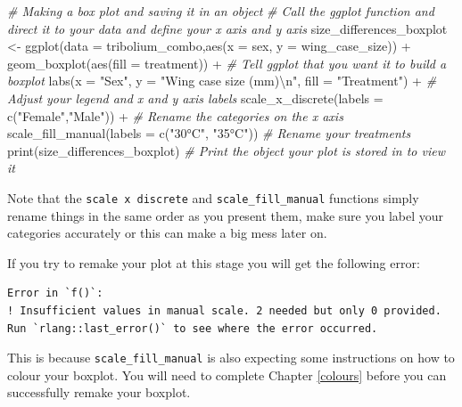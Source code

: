 \documentclass[
]{book}
\newenvironment{Shaded}{\begin{snugshade}}{\end{snugshade}}
\newcommand{\AttributeTok}[1]{\textcolor[rgb]{0.77,0.63,0.00}{#1}}
\newcommand{\CommentTok}[1]{\textcolor[rgb]{0.56,0.35,0.01}{\textit{#1}}}
\newcommand{\FunctionTok}[1]{\textcolor[rgb]{0.00,0.00,0.00}{#1}}
\newcommand{\NormalTok}[1]{#1}
\newcommand{\OtherTok}[1]{\textcolor[rgb]{0.56,0.35,0.01}{#1}}
\newcommand{\SpecialCharTok}[1]{\textcolor[rgb]{0.00,0.00,0.00}{#1}}
\newcommand{\StringTok}[1]{\textcolor[rgb]{0.31,0.60,0.02}{#1}}
\begin{document}
\begin{Shaded}
\begin{Highlighting}[]
\CommentTok{\# Making a box plot and saving it in an object}
\CommentTok{\# Call the ggplot function and direct it to your data and define your x axis and y axis}
\NormalTok{size\_differences\_boxplot }\OtherTok{\textless{}{-}} \FunctionTok{ggplot}\NormalTok{(}\AttributeTok{data =}\NormalTok{ tribolium\_combo,}\FunctionTok{aes}\NormalTok{(}\AttributeTok{x =}\NormalTok{ sex, }\AttributeTok{y =}\NormalTok{ wing\_case\_size)) }\SpecialCharTok{+} 
  \FunctionTok{geom\_boxplot}\NormalTok{(}\FunctionTok{aes}\NormalTok{(}\AttributeTok{fill =}\NormalTok{ treatment)) }\SpecialCharTok{+} \CommentTok{\# Tell ggplot that you want it to build a boxplot}
  \FunctionTok{labs}\NormalTok{(}\AttributeTok{x =} \StringTok{"Sex"}\NormalTok{, }\AttributeTok{y =} \StringTok{"Wing case size (mm)}\SpecialCharTok{\textbackslash{}n}\StringTok{"}\NormalTok{, }\AttributeTok{fill =} \StringTok{"Treatment"}\NormalTok{) }\SpecialCharTok{+} \CommentTok{\# Adjust your legend and x and y axis labels }
  \FunctionTok{scale\_x\_discrete}\NormalTok{(}\AttributeTok{labels =} \FunctionTok{c}\NormalTok{(}\StringTok{"Female"}\NormalTok{,}\StringTok{"Male"}\NormalTok{)) }\SpecialCharTok{+} \CommentTok{\# Rename the categories on the x axis }
  \FunctionTok{scale\_fill\_manual}\NormalTok{(}\AttributeTok{labels =} \FunctionTok{c}\NormalTok{(}\StringTok{"30°C"}\NormalTok{, }\StringTok{"35°C"}\NormalTok{)) }\CommentTok{\# Rename your treatments}
\FunctionTok{print}\NormalTok{(size\_differences\_boxplot) }\CommentTok{\# Print the object your plot is stored in to view it}
\end{Highlighting}
\end{Shaded}

Note that the \texttt{scale\ x\ discrete} and \texttt{scale\_fill\_manual} functions simply rename things in the same order as you present them, make sure you label your categories accurately or this can make a big mess later on.

If you try to remake your plot at this stage you will get the following error:

\begin{verbatim}
Error in `f()`:
! Insufficient values in manual scale. 2 needed but only 0 provided.
Run `rlang::last_error()` to see where the error occurred.
\end{verbatim}

This is because \texttt{scale\_fill\_manual} is also expecting some instructions on how to colour your boxplot. You will need to complete Chapter \ref{colours} before you can successfully remake your boxplot.
\end{document}
